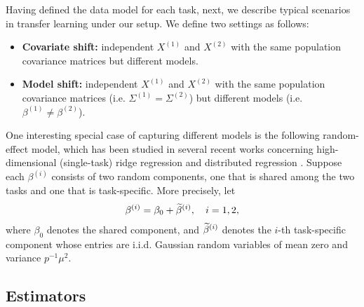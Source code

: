 Having defined the data model for each task, next, we describe typical scenarios in transfer learning under our setup.
We define two settings as follows:
\begin{itemize}
    \item \textbf{Covariate shift:} independent $X^{(1)}$ and $X^{(2)}$ with the same population covariance matrices but different models.
    \item \textbf{Model shift:} independent $X^{(1)}$ and $X^{(2)}$ with the same population covariance matrices (i.e. $\Sigma^{(1)}=\Sigma^{(2)}$) but different models (i.e. $\beta^{(1)} \neq \beta^{(2)}$).
\end{itemize}
One interesting special case of capturing different models is the following random-effect model, which has been studied in several recent works concerning high-dimensional (single-task) ridge regression \cite{dobriban2018high} and distributed regression \cite{dobriban2020wonder}.
Suppose each $\beta^{(i)}$ consists of two random components, one that is shared among the two tasks and one that is task-specific. More precisely, let
\begin{align}
    \beta^{(i)}=\beta_0 +\widetilde \beta^{(i)},\quad i=1,2, \label{eq_re}
\end{align}
where $\beta_0$ denotes the shared component, %
and $\widetilde \beta^{(i)}$ denotes the $i$-th
task-specific component whose entries are i.i.d. Gaussian random variables of mean zero and variance $p^{-1} \mu^2$.


\subsection{Estimators}

